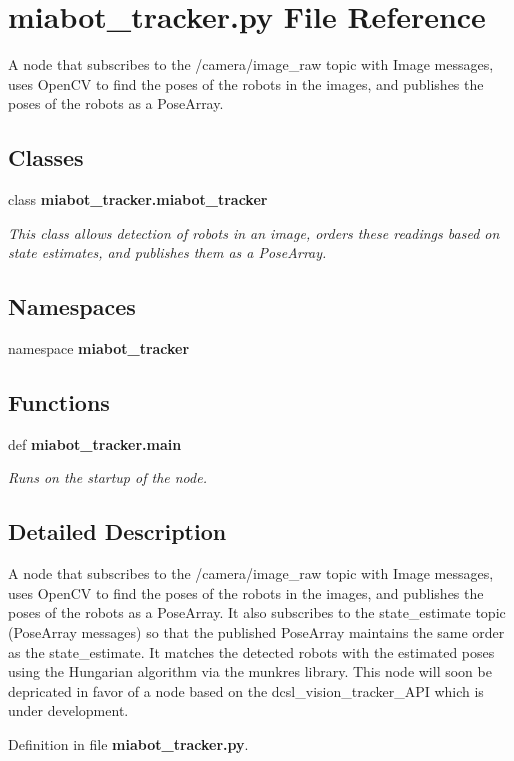 \section{miabot\-\_\-tracker.\-py \-File \-Reference}
\label{miabot__tracker_8py}


\-A node that subscribes to the /camera/image\-\_\-raw topic with \-Image messages, uses \-Open\-C\-V to find the poses of the robots in the images, and publishes the poses of the robots as a \-Pose\-Array.  


\subsection*{\-Classes}
\begin{DoxyCompactItemize}
\item 
class {\bf miabot\-\_\-tracker.\-miabot\-\_\-tracker}
\begin{DoxyCompactList}\small\item\em \-This class allows detection of robots in an image, orders these readings based on state estimates, and publishes them as a \-Pose\-Array. \end{DoxyCompactList}\end{DoxyCompactItemize}
\subsection*{\-Namespaces}
\begin{DoxyCompactItemize}
\item 
namespace {\bf miabot\-\_\-tracker}
\end{DoxyCompactItemize}
\subsection*{\-Functions}
\begin{DoxyCompactItemize}
\item 
def {\bf miabot\-\_\-tracker.\-main}
\begin{DoxyCompactList}\small\item\em \-Runs on the startup of the node. \end{DoxyCompactList}\end{DoxyCompactItemize}


\subsection{\-Detailed \-Description}
\-A node that subscribes to the /camera/image\-\_\-raw topic with \-Image messages, uses \-Open\-C\-V to find the poses of the robots in the images, and publishes the poses of the robots as a \-Pose\-Array. \-It also subscribes to the state\-\_\-estimate topic (\-Pose\-Array messages) so that the published \-Pose\-Array maintains the same order as the state\-\_\-estimate. \-It matches the detected robots with the estimated poses using the \-Hungarian algorithm via the munkres library. \-This node will soon be depricated in favor of a node based on the dcsl\-\_\-vision\-\_\-tracker\-\_\-\-A\-P\-I which is under development. 

\-Definition in file {\bf miabot\-\_\-tracker.\-py}.

